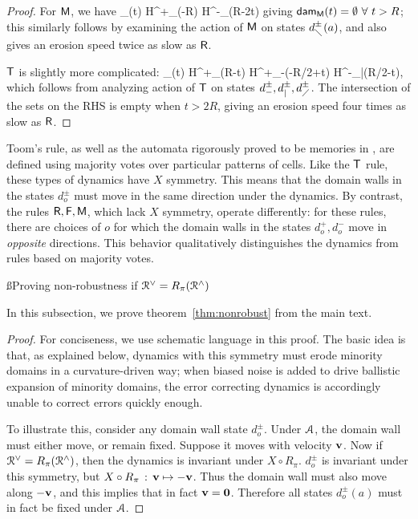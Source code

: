 \documentclass[pra,aps,twocolumn,groupedaddress,superscriptaddress,nofootinbib,preprintnumbers]{revtex4-2}
\begin{document}
\begin{widetext}
\begin{proof}
			For $\mathsf{M}$, we have
			\be \dam_\sfM(t) \subset H^+_\diagdown (-R) \cap H^-_\diagdown(R-2t)\ee 
			giving ${\sf dam}_{\mathsf{M}}(t) = \emptyset \,\, \forall \,\, t > R$; this similarly follows by examining the action of $\mathsf{M}$ on states $d^\pm_\diagdown(a)$, and also gives an erosion speed twice as slow as $\mathsf{R}$. 
			
			$\mathsf{T}$ is slightly more complicated: 
			\be \dam_\sfT(t) \subset H^+_\diagup(R-t) \cap H^+_-(-R/2+t) \cap H^-_|(R/2-t),  \ee 
			which follows from analyzing action of $\mathsf{T}$ on states $d^\pm_-,d^\pm_|,d^\pm_\diagup$. The intersection of the sets on the RHS is empty when $t > 2R$, giving an erosion speed four times as slow as $\mathsf{R}$.
		\end{proof} 
		Toom's rule, as well as the automata rigorously proved to be memories in \cite{pajouheshgar2025exploring}, are defined using majority votes over particular patterns of cells. Like the $\mathsf{T}$ rule, these types of dynamics have $X$ symmetry. This means that the domain walls in the states $d^\pm_o$ must move in the same direction under the dynamics. By contrast, the rules $\mathsf{R},\mathsf{F},\mathsf{M}$, which lack $X$ symmetry, operate differently: for these rules, there are choices of $o$ for which the domain walls in the states $d^+_o,d^-_o$ move in {\it opposite} directions. This behavior qualitatively distinguishes the dynamics from rules based on majority votes.  
		
		\ss{Proving non-robustness if $\mathcal{R}^\vee = R_\pi (\mathcal{R}^\wedge)$}
		
		In this subsection, we prove theorem~\ref{thm:nonrobust} from the main text. 
		
		\begin{proof}
			For conciseness, we use schematic language in this proof. The basic idea is that, as explained below, dynamics with this symmetry must erode minority domains in a curvature-driven way; when biased noise is added to drive ballistic expansion of minority domains, the error correcting dynamics is accordingly unable to correct errors quickly enough. 
			
			To illustrate this, consider any domain wall state $d^\pm_o$. Under $\mathcal{A}$, the domain wall must either move, or remain fixed. Suppose it moves with velocity $\mathbf{v}$. Now if $\mathcal{R}^\vee = R_\pi(\mathcal{R}^\wedge)$, then the dynamics is invariant under $X \circ R_\pi$. $d^\pm_o$ is invariant under this symmetry, but $X \circ R_\pi \, : \, \mathbf{v} \mapsto - \mathbf{v}$. Thus the domain wall must also move along $-\mathbf{v}$, and this implies that in fact $\mathbf{v} = {\mathbf{0}}$. 
			Therefore all states $d^\pm_o(a)$ must in fact be fixed under $\mathcal{A}$. 
			

\end{proof}
\end{widetext}
\end{document}
